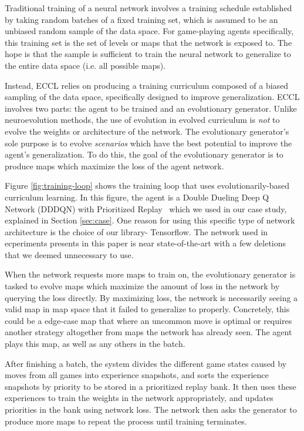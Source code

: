\documentclass[letterpaper]{article} %
\begin{document}
Traditional training of a neural network involves a training schedule established by taking random batches of a fixed training set, which is assumed to be an unbiased random sample of the data space. For game-playing agents specifically, this training set is the set of levels or maps that the network is exposed to. The hope is that the sample is sufficient to train the neural network to generalize to the entire data space (i.e. all possible maps).

Instead, ECCL relies on producing a training curriculum composed of a biased sampling of the data space, specifically designed to improve generalization. ECCL involves two parts: the agent to be trained and an evolutionary generator. Unlike neuroevolution methods, the use of evolution in evolved curriculum is \emph{not} to evolve the weights or architecture of the network. The evolutionary generator's sole purpose is to evolve \emph{scenarios} which have the best potential to improve the agent's generalization. To do this, the goal of the evolutionary generator is to produce maps which maximize the loss of the agent network.

Figure \ref{fig:training-loop} shows the training loop that uses evolutionarily-based curriculum learning. In this figure, the agent is a Double Dueling Deep Q Network (DDDQN) with Prioritized Replay~\cite{wang2016dueling,schaul2015prioritized} which we used in our case study, explained in Section \ref{sec:case}. One reason for using this specific type of network architecture is the choice of our library- Tensorflow. The network used in ecperiments presents in this paper is near state-of-the-art with a few deletions that we deemed unnecessary to use.

When the network requests more maps to train on, the evolutionary generator is tasked to evolve maps which maximize the amount of loss in the network by querying the loss directly. By maximizing loss, the network is necessarily seeing a valid map in map space that it failed to generalize to properly. Concretely, this could be a edge-case map that where an uncommon move is optimal or requires another strategy altogether from maps the network has already seen. The agent plays this map, as well as any others in the batch.


After finishing a batch, the system divides the different game states caused by moves from all games into experience snapshots, and sorts the experience snapshots by priority to be stored in a prioritized replay bank. It then uses these experiences to train the weights in the network appropriately, and updates priorities in the bank using network loss. The network then asks the generator to produce more maps to repeat the process until training terminates.
\end{document}
